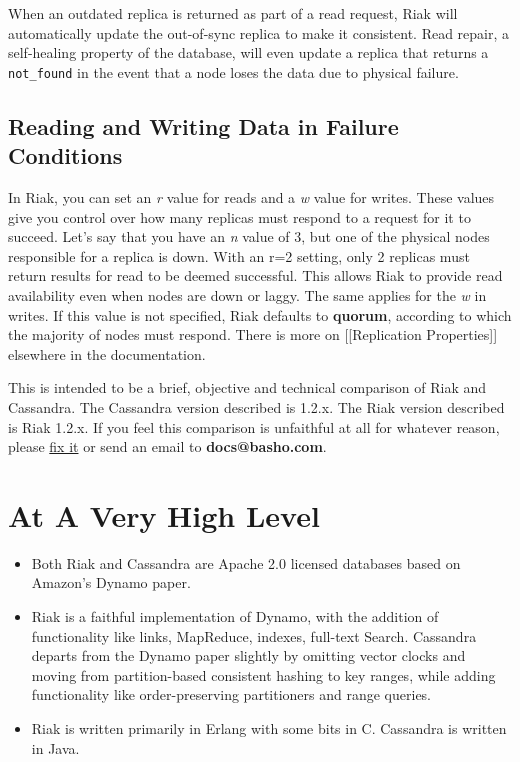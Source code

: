 \documentclass[letter]{book}
\newcounter{tab}[chapter]
\begin{document}
When an outdated replica is returned as part of a read request, Riak will automatically update the out-of-sync replica to make it consistent. Read repair, a self-healing property of the database, will even update a replica that returns a \texttt{not\_found} in the event that a node loses the data due to physical failure.

\subsection{Reading and Writing Data in Failure Conditions}\label{reading-and-writing-data-in-failure-conditions}

In Riak, you can set an \emph{r} value for reads and a \emph{w} value for writes. These values give you control over how many replicas must respond to a request for it to succeed. Let's say that you have an \emph{n} value of 3, but one of the physical nodes responsible for a replica is down. With an r=2 setting, only 2 replicas must return results for read to be deemed successful. This allows Riak to provide read availability even when nodes are down or laggy. The same applies for the \emph{w} in writes. If this value is not specified, Riak defaults to \textbf{quorum}, according to which the majority of nodes must respond. There is more on {[}{[}Replication Properties{]}{]} elsewhere in the documentation.

This is intended to be a brief, objective and technical comparison of Riak and Cassandra. The Cassandra version described is 1.2.x. The Riak version described is Riak 1.2.x. If you feel this comparison is unfaithful at all for whatever reason, please \href{https://github.com/basho/basho_docs/issues/new}{fix it} or send an email to \textbf{docs@basho.com}.

\section{At A Very High Level}\label{at-a-very-high-level}

\begin{itemize}
\itemsep1pt\parskip0pt
\item
  Both Riak and Cassandra are Apache 2.0 licensed databases based on Amazon's Dynamo paper.
\item
  Riak is a faithful implementation of Dynamo, with the addition of functionality like links, MapReduce, indexes, full-text Search. Cassandra departs from the Dynamo paper slightly by omitting vector clocks and moving from partition-based consistent hashing to key ranges, while adding functionality like order-preserving partitioners and range queries.
\item
  Riak is written primarily in Erlang with some bits in C. Cassandra is written in Java.
\end{itemize}
\end{document}
